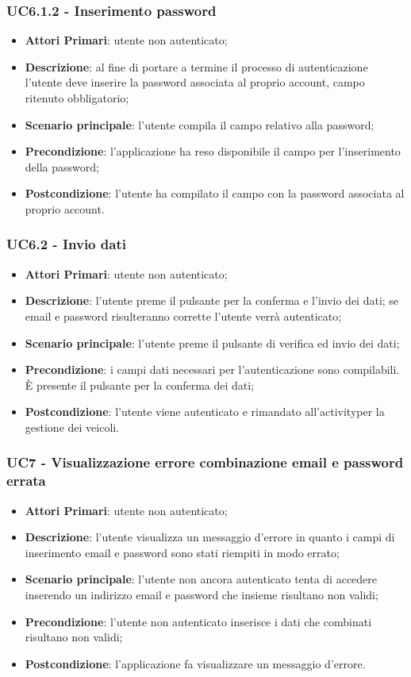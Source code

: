 \subsubsection{UC6.1.2 - Inserimento password}
\begin{itemize}
	\item \textbf{Attori Primari}: utente non autenticato;
	\item \textbf{Descrizione}: al fine di portare a termine il processo di autenticazione l'utente deve inserire la password associata al proprio account, campo ritenuto obbligatorio;
	\item \textbf{Scenario principale}: l'utente compila il campo relativo alla password;	
	\item \textbf{Precondizione}: l'applicazione ha reso disponibile il campo per l'inserimento della password;
	\item \textbf{Postcondizione}: l'utente ha compilato il campo con la password associata al proprio account.
\end{itemize}

\subsubsection{UC6.2 - Invio dati}
\begin{itemize}
	\item \textbf{Attori Primari}: utente non autenticato;
	\item \textbf{Descrizione}: l'utente preme il pulsante per la conferma e l'invio dei dati; se email e password risulteranno corrette l'utente verrà autenticato;
	\item \textbf{Scenario principale}: l'utente preme il pulsante di verifica ed invio dei dati;	
	\item \textbf{Precondizione}: i campi dati necessari per l'autenticazione sono compilabili. È presente il pulsante per la conferma dei dati;
	\item \textbf{Postcondizione}: l'utente viene autenticato e rimandato all'activity\glosp per la gestione dei veicoli.
\end{itemize}

\subsubsection{UC7 - Visualizzazione errore combinazione email e password errata}
\begin{itemize}
	\item \textbf{Attori Primari}: utente non autenticato;
	\item \textbf{Descrizione}: l'utente visualizza un messaggio d'errore in quanto i campi di inserimento email e password sono stati riempiti in modo errato;
	\item \textbf{Scenario principale}: l'utente non ancora autenticato tenta di accedere inserendo un indirizzo email e password che insieme risultano non validi;	
	\item \textbf{Precondizione}: l'utente non autenticato inserisce i dati che combinati risultano non validi;
	\item \textbf{Postcondizione}: l'applicazione fa visualizzare un messaggio d'errore.
\end{itemize}

